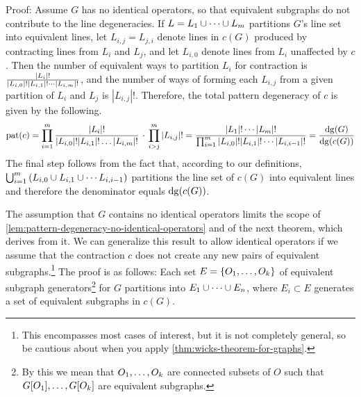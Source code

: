 \documentclass[11pt]{article}
\numberwithin{equation}{section}
\begin{document}
\begin{samepage}
\begin{lem}\label{lem:pattern-degeneracy-no-identical-operators}
\begin{addmargin}[1em]{0em}
{\renewcommand*{\thefootnote}{\fnsymbol{footnote}}%
  Proof\footnotemark[3]:%
}
  Assume $G$ has no identical operators, so that equivalent subgraphs do not contribute to the line degeneracies.
  If $L=L_1\cup\cdots\cup L_m$ partitions $G$'s line set into equivalent lines, let $L_{i,j}=L_{j,i}$ denote lines in $c(G)$ produced by contracting lines from $L_i$ and $L_j$, and let $L_{i,0}$ denote lines from $L_i$ unaffected by $c$.
  Then the number of equivalent ways to partition $L_i$ for contraction is $\frac {|L_i|!}{|L_{i,0}|!|L_{i,1}|!\cdots|L_{i,m}|!}$, and the number of ways of forming each $L_{i,j}$ from a given partition of $L_i$ and $L_j$ is $|L_{i,j}|!$.
  Therefore, the total pattern degeneracy of $c$ is given by the following.
  \begin{align*}
    \mathrm{pat}(c)
  =
    \prod_{i=1}^m
    \frac {|L_i|!}{|L_{i,0}|!|L_{i,1}|!\ldots|L_{i,m}|!}
    \,\cdot\,
    \prod_{i>j}^m
    |L_{i,j}|!
  =
    \frac {
      |L_1|!\cdots|L_m|!
    }{
      \prod_{i=1}^m
      |L_{i,0}|!
      |L_{i,1}|!\cdots|L_{i,i-1}|!
    }
  =
    \frac {\mathrm{dg}(G)}{\mathrm{dg}(c(G))}
  \end{align*}
  The final step follows from the fact that, according to our definitions, $\bigcup_{i=1}^m \left(L_{i,0}\cup L_{i,1}\cup\cdots L_{i,i-1}\right)$ partitions the line set of $c(G)$ into equivalent lines and therefore the denominator equals $\mathrm{dg}(c(G))$.
\end{addmargin}
\end{lem}
\begin{rmk}\label{rmk:caveat-on-wicks-theorem-for-graphs}
The assumption that $G$ contains no identical operators limits the scope of \cref{lem:pattern-degeneracy-no-identical-operators} and of the next theorem, which derives from it.
We can generalize this result to allow identical operators if we assume that the contraction $c$ does not create any new pairs of equivalent subgraphs.\footnote{
  This encompasses most cases of interest, but it is not completely general, so be cautious about when you apply \cref{thm:wicks-theorem-for-graphs}.
}
The proof is as follows:
Each set $E=\{O_1,\ldots,O_k\}$ of equivalent subgraph generators\footnote{By this we mean that $O_1,\ldots,O_k$ are connected subsets of $O$ such that $G[O_1],\ldots,G[O_k]$ are equivalent subgraphs.} for $G$ partitions into  $E_1\cup\cdots\cup E_n$, where $E_i\subset E$ generates a set of equivalent subgraphs in $c(G)$.

\end{rmk}
\end{samepage}
\end{document}

